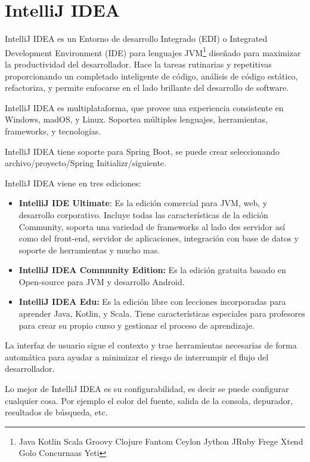 \chapter{IntelliJ IDEA}
IntelliJ IDEA es un Entorno de desarrollo Integrado (EDI) o Integrated Development Environment (IDE) para lenguajes JVM\footnote{Java
    Kotlin
    Scala
    Groovy
    Clojure
    Fantom
    Ceylon
    Jython
    JRuby
    Frege
    Xtend
    Golo
    Concurnaas
    Yeti } 
diseñado para maximizar la productividad del desarrollador. Hace la tareas rutinarias y repetitivas proporcionando un completado inteligente de código, análisis de código estático, refactoriza, y permite enfocarse en el lado brillante del desarrollo de software.

IntelliJ IDEA es multiplataforma, que provee una experiencia consistente en Windows, madOS, y Linux. 
Soportea múltiples lenguajes, herramientas, frameworks, y tecnologías. 

IntelliJ IDEA tiene soporte para Spring Boot, se puede crear seleccionando archivo/proyecto/Spring Initializr/siguiente. 

IntelliJ IDEA viene en tres ediciones:
\begin{itemize}
\item \textbf{IntelliJ IDE Ultimate}: Es la edición comercial para JVM, web, y desarrollo corporativo. Incluye todas las características de la edición Community, soporta una variedad de frameworks al lado des servidor así como del front-end, servidor de aplicaciones, integración con base de datos y soporte de herramientas y mucho mas. 
\item \textbf{IntelliJ IDEA Community Edition:} Es la edición gratuita basado en Open-source para JVM y desarrollo Android.
\item \textbf{IntelliJ IDEA Edu:} Es la edición libre con lecciones incorporadas para aprender Java, Kotlin, y Scala. Tiene características especiales para profesores para crear su propio curso y gestionar el proceso de aprendizaje. 
\end{itemize}

La interfaz de usuario sigue el contexto y trae herramientas necesarias de forma automática para ayudar a minimizar el riesgo de interrumpir el flujo del desarrollador. 

Lo mejor de IntelliJ IDEA es su configurabilidad, es decir se puede configurar cualquier cosa. Por ejemplo el color del fuente, salida de la consola, depurador, resultados de búsqueda, etc. 

